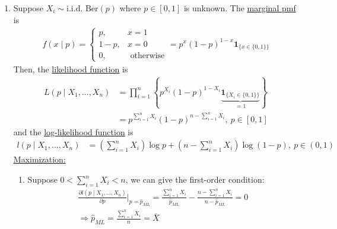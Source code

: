 \documentclass[11pt]{elegantbook}
\begin{document}
\begin{example}\quad
\begin{enumerate}
    \item Suppose $X_i\sim \text{i.i.d. Ber}(p)$ where $p\in[0,1]$ is unknown. The \underline{marginal pmf} is
    \begin{equation}
        \begin{aligned}
            f(x\mid p)=\left\{\begin{matrix}
                p,&x=1\\
                1-p,&x=0\\
                0,&\text{ otherwise}
            \end{matrix}\right.=p^x(1-p)^{1-x}\mathbf{1}_{\{x\in\{0,1\}\}}
        \end{aligned}
        \nonumber
    \end{equation}
    Then, the \underline{likelihood function} is
    \begin{equation}
        \begin{aligned}
            L(p\mid X_1,...,X_n)&=\prod_{i=1}^n\left\{ p^{X_i}(1-p)^{1-X_i}\underbrace{\mathbf{1}_{\{X_i\in\{0,1\}\}}}_{=1}\right\}\\
            &=p^{\sum_{i=1}^n X_i}(1-p)^{n-\sum_{i=1}^n X_i}, \ p\in[0,1]
        \end{aligned}
        \nonumber
    \end{equation}
    and the \underline{log-likelihood function} is
    \begin{equation}
        \begin{aligned}
            l(p\mid X_1,...,X_n)&=(\sum_{i=1}^n X_i)\log p + (n-\sum_{i=1}^n X_i)\log (1-p),\ p\in (0,1)
        \end{aligned}
        \nonumber
    \end{equation}
    \underline{Maximization:}
    \begin{enumerate}
        \item Suppose $0<\sum_{i=1}^n X_i<n$, we can give the first-order condition:
        \begin{equation}
            \begin{aligned}
                \frac{\partial l(p\mid X_1,...,X_n)}{\partial p}\big|_{p=\hat{p}_{ML}}=\frac{\sum_{i=1}^n X_i}{\hat{p}_{ML}}-\frac{n-\sum_{i=1}^n X_i}{n-\hat{p}_{ML}}=0\\
                \Rightarrow \hat{p}_{ML}=\frac{\sum_{i=1}^n X_i}{n}=\bar{X}
            \end{aligned}
            \nonumber

\end{equation}
\end{enumerate}
\end{enumerate}
\end{example}
\end{document}

